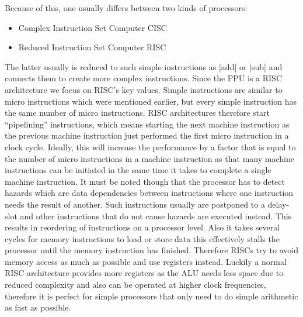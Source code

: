 Because of this, one usually differs between two kinds of processors:
\begin{itemize}
    \item Complex Instruction Set Computer CISC
    \item Reduced Instruction Set Computer RISC
\end{itemize}
The latter usually is reduced to such simple instructions as |add| or |sub| and connects them to create more complex instructions.
Since the PPU is a RISC architecture we focus on RISC's key values.
Simple instructions are similar to micro instructions which were mentioned earlier, but every simple instruction has the same number of micro instructions.
RISC architectures therefore start ``pipelining'' instructions, which means starting the next machine instruction as the previous machine instruction just performed the first micro instruction in a clock cycle.
Ideally, this will increase the performance by a factor that is equal to the number of micro instructions in a machine instruction as that many machine instructions can be initiated in the same time it takes to complete a single machine instruction.
It must be noted though that the processor has to detect hazards which are data dependencies between instructions where one instruction needs the result of another.
Such instructions usually are postponed to a delay-slot and other instructions that do not cause hazards are executed instead.
This results in reordering of instructions on a processor level.
Also it takes several cycles for memory instructions to load or store data this effectively stalls the processor until the memory instruction has finished.
Therefore RISCs try to avoid memory access as much as possible and use registers instead.
Luckily a normal RISC architecture provides more registers as the ALU needs less space due to reduced complexity and also can be operated at higher clock frequencies, therefore it is perfect for simple processors that only need to do simple arithmetic as fast as possible.

